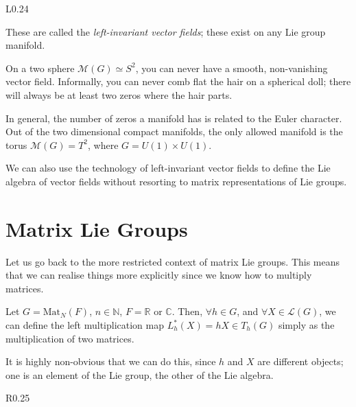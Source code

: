 \begin{wrapfigure}{L}{0.24\columnwidth}
  \centering
  \def\svgwidth{0.2\columnwidth}
  
  \label{fig:hairyball}
\end{wrapfigure}

These are called the \emph{left-invariant vector fields}; these exist on any Lie group manifold.

\begin{example}
  On a two sphere $\mathcal{M}(G) \simeq S^2$, you can never have a smooth, non-vanishing vector field.
  Informally, you can never comb flat the hair on a spherical doll; there will always be at least two zeros where the hair parts.
\end{example}
In general, the number of zeros a manifold has is related to the Euler character.
Out of the two dimensional compact manifolds, the only allowed manifold is the torus $\mathcal{M}(G) = T^2$, where $G = U(1) \times U(1)$.

We can also use the technology of left-invariant vector fields to define the Lie algebra of vector fields without resorting to matrix representations of Lie groups.

\section{Matrix Lie Groups}%
\label{sec:matrix_lie_groups-again}

Let us go back to the more restricted context of matrix Lie groups. This means that we can realise things more explicitly since we know how to multiply matrices.
\begin{claim}
  Let $G = \text{Mat}_N(F)$, $n \in \mathbb{N}$, $F = \mathbb{R} \text{ or } \mathbb{C}$.
  Then, $\forall h \in G$, and $\forall X \in \mathscr{L}(G)$, we can define the left multiplication map $L_h^*(X) = h X \in T_h(G)$ simply as the multiplication of two matrices.
\end{claim}
\begin{leftbar}
  \begin{remark}
    It is highly non-obvious that we can do this, since $h$ and $X$ are different objects; one is an element of the Lie group, the other of the Lie algebra.
  \end{remark}
\end{leftbar}

\begin{wrapfigure}{R}{0.25\columnwidth}
  \centering
  \def\svgwidth{0.2\columnwidth}
  
  \caption{}
  \label{fig:l8f4}
\end{wrapfigure}

